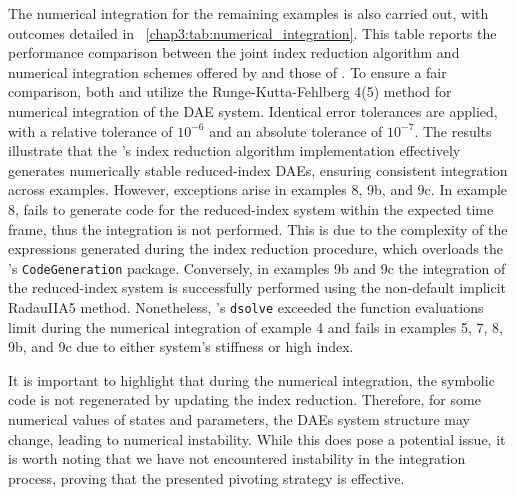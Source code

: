 The numerical integration for the remaining examples is also carried out, with outcomes detailed in \tablename{}~\ref{chap3:tab:numerical_integration}. This table reports the performance comparison between the joint index reduction algorithm and numerical integration schemes offered by \Maple{} and those of \Indigo{}. To ensure a fair comparison, both \Maple{} and \Indigo{} utilize the Runge-Kutta-Fehlberg 4(5) method for numerical integration of the \ac{DAE} system. Identical error tolerances are applied, with a relative tolerance of $10^{-6}$ and an absolute tolerance of $10^{-7}$. The results illustrate that the \Indigo{}'s index reduction algorithm implementation effectively generates numerically stable reduced-index \acp{DAE}, ensuring consistent integration across examples. However, exceptions arise in examples 8, 9b, and 9c. In example 8, \Maple{} fails to generate code for the reduced-index system within the expected time frame, thus the integration is not performed. This is due to the complexity of the expressions generated during the index reduction procedure, which overloads the \Maple{}'s \texttt{CodeGeneration} package. Conversely, in examples 9b and 9c the integration of the reduced-index system is successfully performed using the non-default implicit RadauIIA5 method. Nonetheless, \Maple{}'s \texttt{dsolve} exceeded the function evaluations limit during the numerical integration of example 4 and fails in examples 5, 7, 8, 9b, and 9c due to either system's stiffness or high index.

It is important to highlight that during the numerical integration, the symbolic code is not regenerated by updating the index reduction. Therefore, for some numerical values of states and parameters, the \acp{DAE} system structure may change, leading to numerical instability. While this does pose a potential issue, it is worth noting that we have not encountered instability in the integration process, proving that the presented pivoting strategy is effective.




